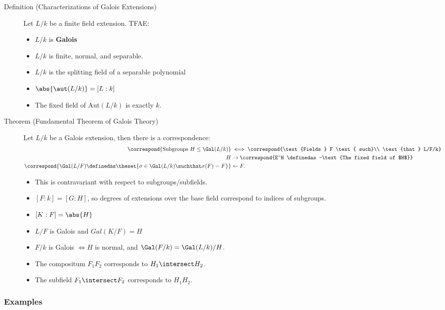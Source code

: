\begin{description}
\item[Definition (Characterizations of Galois Extensions)]
Let \(L/k\) be a finite field extension. TFAE:

\begin{itemize}
\tightlist
\item
  \(L/k\) is \textbf{Galois}
\item
  \(L/k\) is finite, normal, and separable.
\item
  \(L/k\) is the splitting field of a separable polynomial
\item
  \(\abs{\aut(L/k)} = [L: k]\)
\item
  The fixed field of \(\mathrm{Aut}(L/k)\) is exactly \(k\).
\end{itemize}
\item[Theorem (Fundamental Theorem of Galois Theory)]
Let \(L/k\) be a Galois extension, then there is a correspondence:
\begin{align*}
\correspond{\text{Subgroups } H \leq \Gal(L/k)}
&\iff
\correspond{\text{Fields }  F \text{ such}\\ \text{that } L/F/k} \\
H &\rightarrow \correspond{E^H \definedas ~\text{The fixed field of $H$}} \\
\correspond{\Gal(L/F) \definedas \theset{ \sigma \in \Gal(L/k) \suchthat \sigma(F) = F}} &\leftarrow F
.\end{align*}

\begin{itemize}
\item
  This is contravariant with respect to subgroups/subfields.
\item
  \([F: k] = [G: H]\), so degrees of extensions over the base field
  correspond to indices of subgroups.
\item
  \([K : F] = \abs{H}\)
\item
  \(L/F\) is Galois and \(Gal(K/F) = H\)
\item
  \(F/k\) is Galois \(\iff H\) is normal, and
  \(\Gal(F/k) = \Gal(L/k)/H\).
\item
  The compositum \(F_1 F_2\) corresponds to \(H_1 \intersect H_2\).
\item
  The subfield \(F_1 \intersect F_2\) corresponds to \(H_1 H_2\).
\end{itemize}
\end{description}

\hypertarget{examples}{%
\subsubsection{Examples}\label{examples}}


